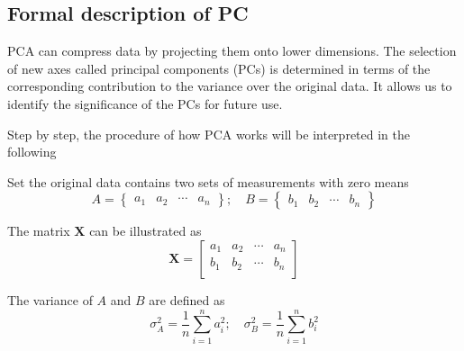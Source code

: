 \documentclass{aa}
\begin{document}
\begin{CJK*}{UTF8}{gbsn}
   
\subsection{Formal description of PC}
   
   PCA can compress data by projecting them onto lower dimensions. The selection of new axes called principal components (PCs) is determined in terms of the corresponding contribution to the variance over the original data. It allows us to identify the significance of the PCs for future use.
   
   Step by step, the procedure of how PCA works will be interpreted in the following \citep{abdi2010principal,jolliffe2016principal}
  
   Set the original data contains two sets of measurements with zero means
   \begin{equation}
     A = \begin{Bmatrix}
            a_{1}      & a_{2}      & \cdots & a_{n} 
         \end{Bmatrix}  ; \quad
     B = \begin{Bmatrix}
            b_{1}      & b_{2}      & \cdots & b_{n} 
         \end{Bmatrix}
   \end{equation}
   
   
   The matrix $\textbf{X}$ can be illustrated as
   \begin{equation}
       \textbf{X} = \left[
                \begin{matrix}
                     a_{1}      & a_{2}      & \cdots & a_{n}      \\
                     b_{1}      & b_{2}      & \cdots & b_{n}      \\
                \end{matrix}
            \right]
   \end{equation}
   
   
   The variance of $A$ and $B$ are defined as
   \begin{equation}
       \sigma_{A}^{2} = \frac{1}{n}\sum_{i=1}^{n}a_{i}^{2}; \quad  \sigma_{B}^{2} = \frac{1}{n}\sum_{i=1}^{n}b_{i}^{2}
   \end{equation} 
   

\end{CJK*}
\end{document}
